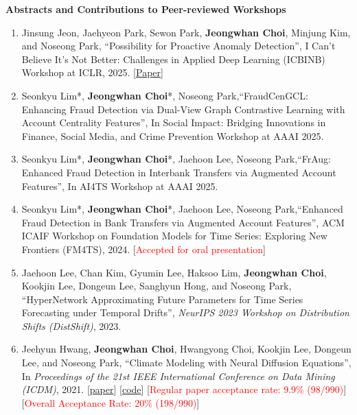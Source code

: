 \documentclass[10pt]{article}
\newenvironment{changemargin}[2]{
  \begin{list}{}{
    \setlength{\topsep}{0pt}
    \setlength{\leftmargin}{#1}
    \setlength{\rightmargin}{#2}
    \setlength{\listparindent}{\parindent}
    \setlength{\itemindent}{\parindent}
    \setlength{\parsep}{\parskip}
  }
  \item[]}{\end{list}
}
\newcommand{\RED}[1]{\textcolor{red}{#1}}
\newenvironment{body} {
	\vspace*{-16pt}
	\begin{changemargin}{-0.25in}{-0.5in}
  }
	{\end{changemargin}
}
\begin{document}
\begin{body}
\textbf{Abstracts and Contributions to Peer-reviewed Workshops}
\begin{enumerate}
    \item Jinsung Jeon, Jaehyeon Park, Sewon Park, \textbf{Jeongwhan Choi}, Minjung Kim, and Noseong Park, ``Possibility for Proactive Anomaly Detection'', I Can't Believe It's Not Better: Challenges in Applied Deep Learning (ICBINB) Workshop at ICLR, 2025. [\href{https://openreview.net/forum?id=w63aCqNRFp}{Paper}]
    \item Seonkyu Lim*, \textbf{Jeongwhan Choi}*, Noseong Park,``FraudCenGCL: Enhancing Fraud Detection via Dual-View Graph Contrastive Learning with Account Centrality Features'', In Social Impact: Bridging Innovations in Finance, Social Media, and Crime Prevention Workshop at AAAI 2025.
    \item Seonkyu Lim*, \textbf{Jeongwhan Choi}*, Jaehoon Lee, Noseong Park,``FrAug: Enhanced Fraud Detection in Interbank Transfers via Augmented Account Features'', In AI4TS Workshop at AAAI 2025.
    \item Seonkyu Lim*, \textbf{Jeongwhan Choi}*, Jaehoon Lee, Noseong Park,``Enhanced Fraud Detection in Bank Transfers via Augmented Account Features'', ACM ICAIF Workshop on Foundation Models for Time Series: Exploring New Frontiers (FM4TS), 2024. [\RED{Accepted for oral presentation}]
    \item Jaehoon Lee, Chan Kim, Gyumin Lee, Haksoo Lim, \textbf{Jeongwhan Choi}, Kookjin Lee, Dongeun Lee, Sanghyun Hong, and Noseong Park, ``HyperNetwork Approximating Future Parameters for Time Series Forecasting under Temporal Drifts'', \emph{NeurIPS 2023 Workshop on Distribution Shifts (DistShift)}, 2023.
    \item Jeehyun Hwang, \textbf{Jeongwhan Choi}, Hwangyong Choi, Kookjin Lee, Dongeun Lee, and Noseong Park, ``Climate Modeling with Neural Diffusion Equations'', In \emph{Proceedings of the 21st IEEE International Conference on Data Mining (ICDM)}, 2021.  [\href{https://arxiv.org/abs/2111.06011}{paper}] [\href{https://github.com/jeongwhanchoi/Neural-Diffusion-Equation}{code}] [\RED{Regular paper acceptance rate: 9.9\%  (98/990)}] [\RED{Overall Acceptance Rate: 20\%  (198/990)}]
\end{enumerate}


\end{body}
\end{document}
